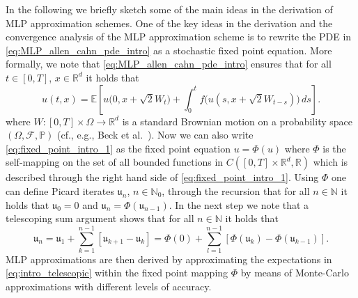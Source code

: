\documentclass[12pt,AutoFakeBold,AutoFakeSlant]{article}
\theoremstyle{definition}
\newcommand{\R}{\mathbb{R}}
\renewcommand{\P}{\mathbb{P}}
\newcommand{\E}{\mathbb{E}}
\newcommand{\N}{\mathbb{N}}
\begin{document}
	In the following we briefly sketch some of the main ideas 
	in the derivation of MLP approximation schemes. 
	One of the key ideas in the derivation and the convergence analysis 
	of the MLP approximation scheme is to rewrite 
	the PDE in \eqref{eq:MLP_allen_cahn_pde_intro} as a 
	stochastic fixed point equation. More formally, we note that 
	\eqref{eq:MLP_allen_cahn_pde_intro} ensures that 
	for all $ t \in [0,T] $, $ x \in \R^d $ it holds that
	\begin{equation}
	\label{eq:fixed_point_intro_1}
	u(t,x) 
	=
	\E\!\left[ 
		u\big( 
		0, x + \sqrt{2} W_t 
		\big) 
		+
		\int_0^t 
		f\big( 
		u(s, x + \sqrt{2} W_{ t - s } ) 
		\big)
		\, ds
	\right]
	.
	\end{equation}
	where $ W \colon [0,T] \times \Omega \to \R^d $ 
	is a standard Brownian motion 
	on a probability space $ ( \Omega, \mathcal{F}, \P ) $ 
	(cf., e.g., Beck et al.~\cite[Theorem~1.1]{beck2020nonlinear}). 
	Now we can also write \eqref{eq:fixed_point_intro_1} 
	as the fixed point equation 
	$ u = \Phi( u ) $
	where $ \Phi $ is the self-mapping on the set of all bounded functions 
	in $ C( [0,T] \times \R^d, \R ) $ which is described through 
	the right hand side of \eqref{eq:fixed_point_intro_1}. 
	Using $ \Phi $ one can define Picard iterates $ \mathfrak{u}_n $, $ n \in \N_0 $, through the recursion 
	that for all $ n \in \N $ it holds that
	$ \mathfrak{u}_0 = 0 $ and $ \mathfrak{u}_n = \Phi( \mathfrak{u}_{ n - 1 } ) $. 
	In the next step we note that a telescoping sum argument shows that for all $ n \in \N $ it holds that
	\begin{equation}
	\label{eq;intro_telescopic}
	\mathfrak{u}_n 
	= \mathfrak{u}_1 + \sum_{ k = 1 }^{ n - 1 } \left[ \mathfrak{u}_{ k + 1 } - \mathfrak{u}_k \right]
	= \Phi( 0 ) + \sum_{ l = 1 }^{ n - 1 } \left[ \Phi( \mathfrak{u}_k ) - \Phi( \mathfrak{u}_{ k - 1 } ) \right] 
	.
	\end{equation}
	MLP approximations are then derived by approximating 
	the expectations in \eqref{eq;intro_telescopic} 
	within the fixed point mapping $ \Phi $ by means of Monte-Carlo approximations 
	with different levels of accuracy. 
\end{document}
